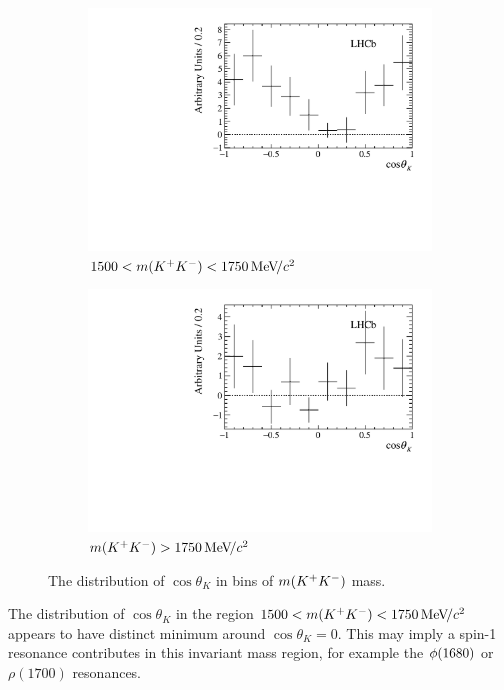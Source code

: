 \begin{figure}[!h]
\begin{subfigure}[t]{0.49\textwidth}
        \includegraphics[width=1.0\textwidth]{figs/B2DsKK/helAngle_bin3_sweighted.pdf}
        \caption{$1500<m({{K}^+}{{K}^-})<1750{\mathrm{\,Me\kern -0.1em V\!/}c^2}$}
    \end{subfigure}
    \begin{subfigure}[t]{0.49\textwidth}
        \includegraphics[width=1.0\textwidth]{figs/B2DsKK/helAngle_bin4_sweighted.pdf}
        \caption{$m({{K}^+}{{K}^-})>1750{\mathrm{\,Me\kern -0.1em V\!/}c^2}$}
    \end{subfigure}
    \caption{The distribution of $\cos{\theta_{K}}$ in bins of $m({{K}^+}{{K}^-})$ mass.}
    \label{fig:B2DsKK_helicty_angle_bins}
\end{figure}
The distribution of $\cos{\theta_{K}}$ in the region $1500<m({{K}^+}{{K}^-})<1750{\mathrm{\,Me\kern -0.1em V\!/}c^2}$ appears to have distinct minimum around $\cos{\theta_{K}}=0$. This may imply a spin-1 resonance contributes in this invariant mass region, for example the $\phi(1680)$ or $\rho(1700)$ resonances.


